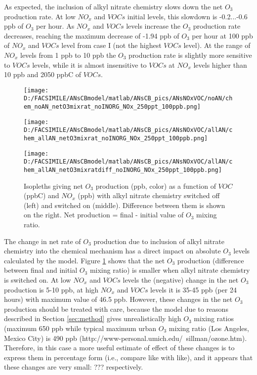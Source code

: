 \documentclass[11pt,a4paper]{article}
\begin{document}
As expected, the inclusion of alkyl nitrate chemistry slows down the net $O_3$ production rate. At low $NO_x$ and $VOCs$ initial levels, this slowdown is -0.2...-0.6 ppb of $O_3$ per hour. As $NO_x$ and $VOCs$ levels increase the $O_3$ production rate decreases, reaching the maximum decrease of -1.94 ppb of $O_3$ per hour at 100 ppb of $NO_x$ and $VOCs$ level from case I (not the highest $VOCs$ level). At the range of $NO_x$ levels from 1 ppb to 10 ppb the $O_3$ production rate is slightly more sensitive to $VOCs$ levels, while it is almost insensitive to $VOCs$ at $NO_x$ levels higher than 10 ppb and 2050 ppbC of $VOCs$. 

\begin{figure} %
\centering
\begin{minipage}{.3\textwidth}
  \centering
  \texttt{[image: D:/FACSIMILE/ANsCBmodel/matlab/ANsCB\_pics/ANsNOxVOC/noAN/chem\_noAN\_netO3mixrat\_noINORG\_NOx\_250ppt\_100ppb.png]}
\end{minipage}
\begin{minipage}{.3\textwidth}
  \centering
  \texttt{[image: D:/FACSIMILE/ANsCBmodel/matlab/ANsCB\_pics/ANsNOxVOC/allAN/chem\_allAN\_netO3mixrat\_noINORG\_NOx\_250ppt\_100ppb.png]}
\end{minipage}
\begin{minipage}{.3\textwidth}
  \centering
  \texttt{[image: D:/FACSIMILE/ANsCBmodel/matlab/ANsCB\_pics/ANsNOxVOC/allAN/chem\_allAN\_netO3mixratdiff\_noINORG\_NOx\_250ppt\_100ppb.png]}
\end{minipage}
\caption{Isopleths giving net $O_3$ production (ppb, color) as a function of $VOC$ (ppbC) and $NO_x$ (ppb) with alkyl nitrate chemistry switched off (left) and switched on (middle). Difference between them is shown on the right. Net production = final - initial value of $O_3$ mixing ratio.}\label{fig:netO3mixrat_noAN_withAN_diff}
\end{figure}

The change in net rate of $O_3$ production due to inclusion of alkyl nitrate chemistry into the chemical mechanism has a direct impact on absolute $O_3$ levels calculated by the model. Figure \ref{fig:netO3mixrat_noAN_withAN_diff} shows that the net $O_3$ production (difference between final and initial $O_3$ mixing ratio) is smaller when alkyl nitrate chemistry is switched on. At low $NO_x$ and $VOCs$ levels the (negative) change in the net $O_3$ production is 5-10 ppb, at high $NO_x$ and $VOCs$ levels it is 35-45 ppb (per 24 hours) with maximum value of 46.5 ppb. However, these changes in the net $O_3$ production should be treated with care, because the model due to reasons described in Section \ref{sec:method} gives unrealistically high $O_3$ mixing ratios (maximum 650 ppb while typical maximum urban $O_3$ mixing ratio (Los Angeles, Mexico City) is 490 ppb (http://www-personal.umich.edu/~sillman/ozone.htm). Therefore, in this case a more useful estimate of effect of these changes is to express them in percentage form (i.e., compare like with like), and it appears that these changes are very small: ??? respectively.
\end{document}
